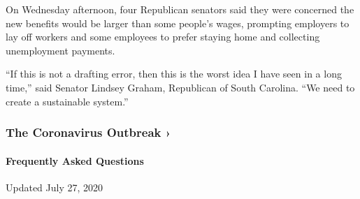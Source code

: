 On Wednesday afternoon, four Republican senators said they were
concerned the new benefits would be larger than some people's wages,
prompting employers to lay off workers and some employees to prefer
staying home and collecting unemployment payments.

``If this is not a drafting error, then this is the worst idea I have
seen in a long time,'' said Senator Lindsey Graham, Republican of South
Carolina. ``We need to create a sustainable system.''

\href{https://www.nytimes.com/news-event/coronavirus?action=click\&pgtype=Article\&state=default\&region=MAIN_CONTENT_3\&context=storylines_faq}{}

\hypertarget{the-coronavirus-outbreak-}{%
\subsubsection{The Coronavirus Outbreak
›}\label{the-coronavirus-outbreak-}}

\hypertarget{frequently-asked-questions}{%
\paragraph{Frequently Asked
Questions}\label{frequently-asked-questions}}

Updated July 27, 2020

